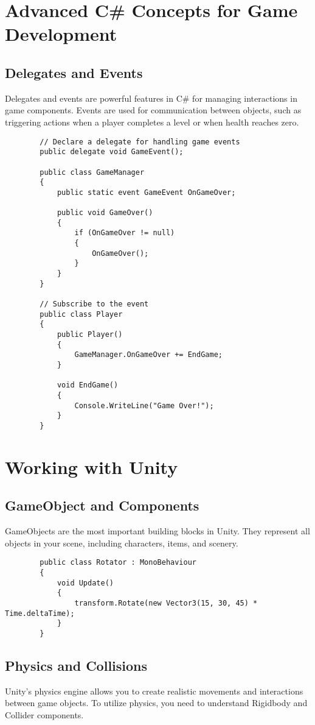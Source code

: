 \documentclass[a4paper,12pt]{book}
\begin{document}
	\chapter{Advanced C\# Concepts for Game Development}
	\section{Delegates and Events}
	Delegates and events are powerful features in C\# for managing interactions in game components. Events are used for communication between objects, such as triggering actions when a player completes a level or when health reaches zero.
	
	\begin{lstlisting}
		// Declare a delegate for handling game events
		public delegate void GameEvent();
		
		public class GameManager
		{
			public static event GameEvent OnGameOver;
			
			public void GameOver()
			{
				if (OnGameOver != null)
				{
					OnGameOver();
				}
			}
		}
		
		// Subscribe to the event
		public class Player
		{
			public Player()
			{
				GameManager.OnGameOver += EndGame;
			}
			
			void EndGame()
			{
				Console.WriteLine("Game Over!");
			}
		}
	\end{lstlisting}
	
	\chapter{Working with Unity}
	\section{GameObject and Components}
	GameObjects are the most important building blocks in Unity. They represent all objects in your scene, including characters, items, and scenery.
	
	\begin{lstlisting}
		public class Rotator : MonoBehaviour
		{
			void Update()
			{
				transform.Rotate(new Vector3(15, 30, 45) * Time.deltaTime);
			}
		}
	\end{lstlisting}
	
	\section{Physics and Collisions}
	Unity's physics engine allows you to create realistic movements and interactions between game objects. To utilize physics, you need to understand Rigidbody and Collider components.
	
\end{document}
